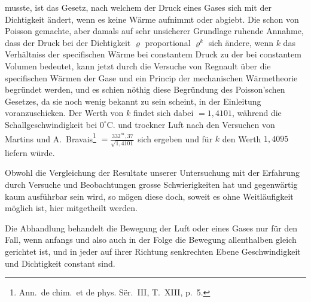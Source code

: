 \documentclass[12pt,a4paper]{article}
\begin{document}
musste, ist das Gesetz, nach welchem der Druck eines Gases sich mit der Dichtigkeit \"andert, wenn es keine W\"arme aufnimmt oder abgiebt. Die schon von Poisson gemachte, aber damals auf sehr unsicherer Grundlage ruhende Annahme, dass der Druck bei der Dichtigkeit $\varrho$ proportional $\varrho^{k}$ sich \"andere, wenn $k$ das Verh\"altniss der specifischen W\"arme bei constantem Druck zu der bei constantem Volumen bedeutet, kann jetzt durch die Versuche von Regnault \"uber die specifischen W\"armen der Gase und ein Princip der mechanischen W\"armetheorie begr\"undet werden, und es schien n\"othig diese Begr\"undung des Poisson'schen Gesetzes, da sie noch wenig bekannt zu sein scheint, in der Einleitung voranzuschicken. Der Werth von $k$ findet sich dabei $= 1{,}4101$, w\"ahrend die Schallgeschwindigkeit bei $0^{\circ}$C. und trockner Luft nach den Versuchen von Martins und A.~Bravais\footnote{Ann.~de chim.~et de phys. S\"er.~III, T.~XIII, p.~5.} $= \frac{332^{m},37}{\sqrt{1,4101}}$ sich ergeben und f\"ur $k$ den Werth $1{,}4095$ liefern w\"urde.

Obwohl die Vergleichung der Resultate unserer Untersuchung mit der Erfahrung durch Versuche und Beobachtungen grosse Schwierigkeiten hat und gegenw\"artig kaum ausf\"uhrbar sein wird, so m\"ogen diese doch, soweit es ohne Weitl\"aufigkeit m\"oglich ist, hier mitgetheilt werden.

Die Abhandlung behandelt die Bewegung der Luft oder eines Gases nur f\"ur den Fall, wenn anfangs und also auch in der Folge die Bewegung allenthalben gleich gerichtet ist, und in jeder auf ihrer Richtung senkrechten Ebene Geschwindigkeit und Dichtigkeit constant sind.
\end{document}
